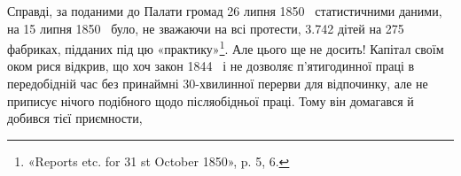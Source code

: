 \noindent{}Справді, за поданими до Палати громад 26 липня 1850~
статистичними даними, на 15 липня 1850~ було, не зважаючи
на всі протести, \num{3.742} дітей на 275 фабриках, підданих під цю
«практику»\footnote{
«Reports etc. for 31 st October 1850», p. 5, 6.
}. Але цього ще не досить! Капітал своїм оком
рися відкрив, що хоч закон 1844~ і не дозволяє п’ятигодинної
праці в передобідній час без принаймні 30-хвилинної перерви
для відпочинку, але не приписує нічого подібного щодо післяобідньої
праці. Тому він домагався й добився тієї приємности,
\parbreak{}  %
